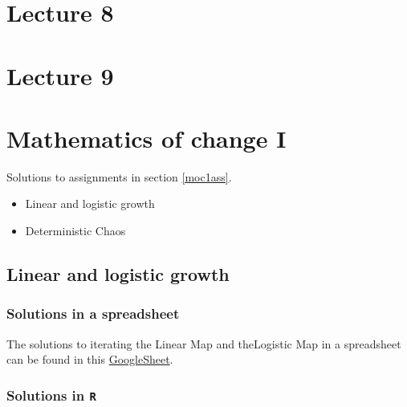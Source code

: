 \documentclass[]{book}
\providecommand{\tightlist}{%
  \setlength{\itemsep}{0pt}\setlength{\parskip}{0pt}}
\let\stdsection\section
\renewcommand\section{\newpage\stdsection}
\begin{document}
\chapter*{Lecture 8}\label{lecture-8}

\chapter*{Lecture 9}\label{lecture-9}

\appendix


\chapter{\texorpdfstring{\textbf{Mathematics of change
I}}{Mathematics of change I}}\label{mathematics-of-change-i}

Solutions to assignments in section \ref{moc1ass}.

\begin{itemize}
\tightlist
\item
  Linear and logistic growth
\item
  Deterministic Chaos
\end{itemize}

\section{\texorpdfstring{\textbf{Linear and logistic
growth}}{Linear and logistic growth}}\label{linear-and-logistic-growth}

\subsection*{Solutions in a
spreadsheet}\label{solutions-in-a-spreadsheet}

The solutions to iterating the Linear Map and theLogistic Map in a
spreadsheet can be found in this
\href{https://docs.google.com/spreadsheets/d/1BL_oKoCFH3NQ3qKLBQ-WbkPg_ppSZsyDNl2nS9oPGcM/edit?usp=sharing}{GoogleSheet}.

\subsection*{\texorpdfstring{Solutions in
\texttt{R}}{Solutions in R}}\label{solutions-in-r}
\end{document}
